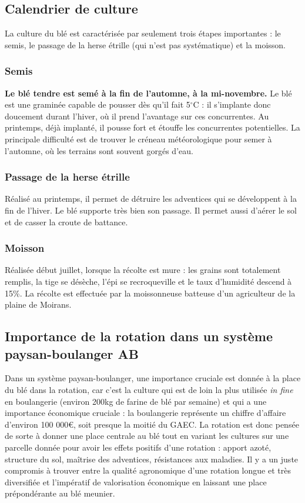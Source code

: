 \documentclass{article}
\begin{document}
\subsection{Calendrier de culture}

La culture du blé est caractérisée par seulement trois étapes importantes : le semis, le passage de la herse étrille (qui n'est pas systématique) et la moisson.

\subsubsection{Semis}

\textbf{Le blé tendre est semé à la fin de l'automne, à la mi-novembre.} Le blé est une graminée capable de pousser dès qu'il fait 5$^\circ$C : il s'implante donc doucement durant l'hiver, où il prend l'avantage sur ces concurrentes. Au printemps, déjà implanté, il pousse fort et étouffe les concurrentes potentielles. La principale difficulté est de trouver le créneau météorologique pour semer à l'automne, où les terrains sont souvent gorgés d'eau. 

\subsubsection{Passage de la herse étrille}

Réalisé au printemps, il permet de détruire les adventices qui se développent à la fin de l'hiver. Le blé supporte très bien son passage. Il permet aussi d'aérer le sol et de casser la croute de battance.  

\subsubsection{Moisson}

Réalisée début juillet, lorsque la récolte est mure : les grains sont totalement remplis, la tige se désèche, l'épi se recroqueville et le taux d'humidité descend à 15\%. La récolte est effectuée par la moissonneuse batteuse d'un agriculteur de la plaine de Moirans. 


\subsection{Importance de la rotation dans un système paysan-boulanger AB}

Dans un système paysan-boulanger, une importance cruciale est donnée à la place du blé dans la rotation, car c'est la culture qui est de loin la plus utilisée \textit{in fine} en boulangerie (environ 200kg de farine de blé par semaine) et qui a une importance économique cruciale : la boulangerie représente un chiffre d'affaire d'environ 100 000\euro{}, soit presque la moitié du GAEC. La rotation est donc pensée de sorte à donner une place centrale au blé tout en variant les cultures sur une parcelle donnée pour avoir les effets positifs d'une rotation : apport azoté, structure du sol, maîtrise des adventices, résistances aux maladies. Il y a un juste compromis à trouver entre la qualité agronomique d'une rotation longue et très diversifiée et l'impératif de valorisation économique en laissant une place prépondérante au blé meunier.
\end{document}
